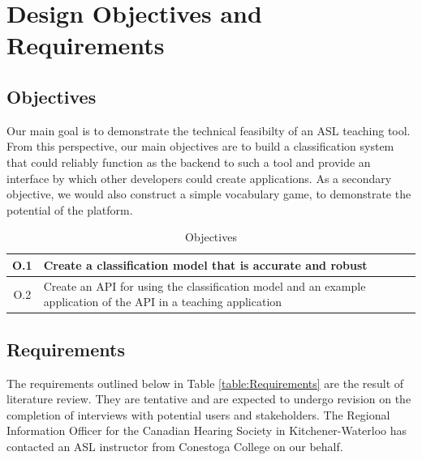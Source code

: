 \documentclass[12pt]{article}
\begin{document}
\newpage
\section{Design Objectives and Requirements}

\subsection{Objectives}
Our main goal is to demonstrate the technical feasibilty of an ASL teaching tool. From this perspective, our main objectives are to build a classification system that could reliably function as the backend to such a tool and provide an interface by which other developers could create applications. As a secondary objective, we would also construct a simple vocabulary game, to demonstrate the potential of the platform.

\begin{table}[h!]
\centering
\caption{Objectives}
\label{table:Objectives}
\vspace{1em}
\begin{tabular}{|c| p{14cm} |}
	\hline
	O.1 & Create a classification model that is accurate and robust \\ \hline
	O.2 & Create an API for using the classification model and an example application of the API in a teaching application \\ \hline
\end{tabular}
\end{table}

\subsection{Requirements}
The requirements outlined below in Table \ref{table:Requirements} are the result of literature review. They are tentative and are expected to undergo revision on the completion of interviews with potential users and stakeholders. The Regional Information Officer for the Canadian Hearing Society in Kitchener-Waterloo has contacted an ASL instructor from Conestoga College on our behalf.
\end{document}

